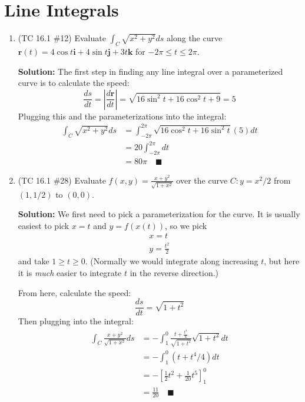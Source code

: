 \documentclass[letterpaper, 11pt]{article}
\begin{document}
\section{Line Integrals}
\begin{enumerate}
\item (TC 16.1 \#12) Evaluate $\int_C \sqrt{x^2 + y^2} ds$ along the curve $\bm{r}(t) = 4\cos t \bm{i} + 4 \sin t \bm{j} + 3t \bm{k}$ for $-2\pi \leq t \leq 2\pi$. 

\par \textbf{Solution:} The first step in finding any line integral over a parameterized curve is to calculate the speed:
\[ \frac{ds}{dt} = \left| \frac{d\bm{r}}{dt} \right| = \sqrt{ 16\sin^2 t + 16 \cos^2 t + 9} = 5 \]
Plugging this and the parameterizations into the integral:
\begin{align*}
\int_C \sqrt{x^2 + y^2} ds &= \int_{-2\pi}^{2\pi} \sqrt{ 16\cos^2 t + 16 \sin^2 t} (5)dt \\
&= 20 \int_{-2\pi}^{2\pi} dt\\
&= 80 \pi \quad\blacksquare
\end{align*}


\item (TC 16.1 \#28) Evaluate $f(x,y) = \frac{x + y^2}{\sqrt{1 + x^2}}$ over the curve $C : y = x^2/2$ from $(1,1/2)$ to $(0,0)$. 

\par \textbf{Solution:} We first need to pick a parameterization for the curve. It is usually easiest to pick $x = t$ and $y = f(x(t))$, so we pick
\begin{gather*}
x = t \\
y = \frac{t^2}{2} 
\end{gather*}
and take $1 \geq t \geq 0$. (Normally we would integrate along increasing $t$, but here it is \textit{much} easier to integrate $t$ in the reverse direction.) 

\par From here, calculate the speed:
\[ \frac{ds}{dt} = \sqrt{1 + t^2} \]
Then plugging into the integral:
\begin{align*}
\int_C \frac{x + y^2}{\sqrt{1 + x^2}}ds &= -\int_1^0 \frac{t + \frac{t^4}{4}}{\sqrt{1 + t^2}} \sqrt{1 + t^2} dt \\
&= -\int_1^0 (t + t^4/4) dt \\
&= -\left[ \frac{1}{2} t^2 + \frac{1}{20} t^5 \right]_1^0 \\
&= \frac{11}{20} \quad\blacksquare
\end{align*}

\end{enumerate}
\end{document}
